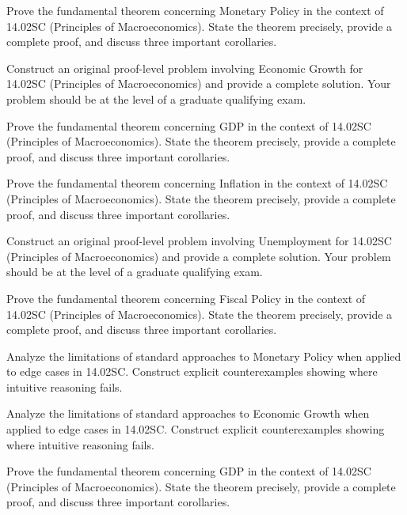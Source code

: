 \documentclass[12pt,a4paper]{exam}
\begin{document}
\begin{questions}
\vspace{0.3cm}

\question[4]
Prove the fundamental theorem concerning Monetary Policy in the context of 14.02SC (Principles of Macroeconomics). State the theorem precisely, provide a complete proof, and discuss three important corollaries.

\vspace{0.3cm}

\question[3]
Construct an original proof-level problem involving Economic Growth for 14.02SC (Principles of Macroeconomics) and provide a complete solution. Your problem should be at the level of a graduate qualifying exam.

\vspace{0.3cm}

\question[4]
Prove the fundamental theorem concerning GDP in the context of 14.02SC (Principles of Macroeconomics). State the theorem precisely, provide a complete proof, and discuss three important corollaries.

\vspace{0.3cm}

\question[2]
Prove the fundamental theorem concerning Inflation in the context of 14.02SC (Principles of Macroeconomics). State the theorem precisely, provide a complete proof, and discuss three important corollaries.

\vspace{0.3cm}

\question[4]
Construct an original proof-level problem involving Unemployment for 14.02SC (Principles of Macroeconomics) and provide a complete solution. Your problem should be at the level of a graduate qualifying exam.

\vspace{0.3cm}

\question[3]
Prove the fundamental theorem concerning Fiscal Policy in the context of 14.02SC (Principles of Macroeconomics). State the theorem precisely, provide a complete proof, and discuss three important corollaries.

\vspace{0.3cm}

\question[4]
Analyze the limitations of standard approaches to Monetary Policy when applied to edge cases in 14.02SC. Construct explicit counterexamples showing where intuitive reasoning fails.

\vspace{0.3cm}

\question[4]
Analyze the limitations of standard approaches to Economic Growth when applied to edge cases in 14.02SC. Construct explicit counterexamples showing where intuitive reasoning fails.

\vspace{0.3cm}

\question[3]
Prove the fundamental theorem concerning GDP in the context of 14.02SC (Principles of Macroeconomics). State the theorem precisely, provide a complete proof, and discuss three important corollaries.

\vspace{0.3cm}

\end{questions}
\end{document}
